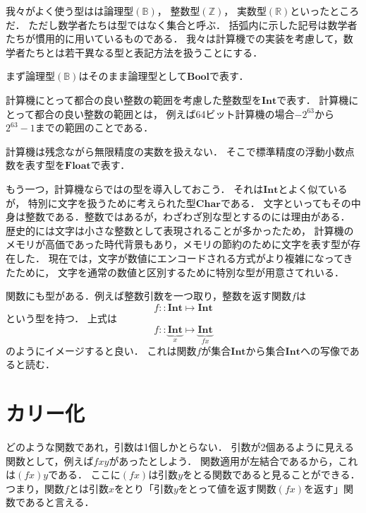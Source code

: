\documentclass[a5paper,draft]{jsbook}
\newcommand{\mathSpecialSet}[1]{\mathbb{#1}} %
\newcommand{\mathTypeName}[1]{\mathbf{#1}}
\newcommand{\mathIn}{\mathrel{::}}
\newcommand{\mathMapsTo}{\mapsto}
\newcommand{\mathMorph}[2]{#1\mathMapsTo#2}
\begin{document}
我々がよく使う型はは論理型$(\mathSpecialSet{B})$，
整数型$(\mathSpecialSet{Z})$，
実数型$(\mathSpecialSet{R})$といったところだ．
ただし数学者たちは型ではなく集合と呼ぶ．
括弧内に示した記号は数学者たちが慣用的に用いているものである．
我々は計算機での実装を考慮して，数学者たちとは若干異なる型と表記方法を扱うことにする．

まず論理型$(\mathSpecialSet{B})$はそのまま論理型として$\mathTypeName{Bool}$で表す．

計算機にとって都合の良い整数の範囲を考慮した整数型を$\mathTypeName{Int}$で表す．
計算機にとって都合の良い整数の範囲とは，
例えば64ビット計算機の場合$-2^{63}$から$2^{63}-1$までの範囲のことである．

計算機は残念ながら無限精度の実数を扱えない．
そこで標準精度の浮動小数点数を表す型を$\mathTypeName{Float}$で表す．

もう一つ，計算機ならではの型を導入しておこう．
それは$\mathTypeName{Int}$とよく似ているが，
特別に文字を扱うために考えられた型$\mathTypeName{Char}$である．
文字といってもその中身は整数である．整数ではあるが，わざわざ別な型とするのには理由がある．
歴史的には文字は小さな整数として表現されることが多かったため，
計算機のメモリが高価であった時代背景もあり，メモリの節約のために文字を表す型が存在した．
現在では，文字が数値にエンコードされる方式がより複雑になってきたために，
文字を通常の数値と区別するために特別な型が用意さてれいる．

関数にも型がある．例えば整数引数を一つ取り，整数を返す関数$f$は
\begin{equation}
f\mathIn\mathMorph{\mathTypeName{Int}}{\mathTypeName{Int}}
\end{equation}
という型を持つ．
上式は
\begin{equation}
f\mathIn
\underbrace{\mathTypeName{Int}}_x
\mathMapsTo
\underbrace{\mathTypeName{Int}}_{fx}
\end{equation}
のようにイメージすると良い．
これは関数$f$が集合$\mathTypeName{Int}$から集合$\mathTypeName{Int}$への写像であると読む．

\section{カリー化}

どのような関数であれ，引数は1個しかとらない．
引数が2個あるように見える関数として，例えば$fxy$があったとしよう．
関数適用が左結合であるから，これは$\left(fx\right)y$である．
ここに$\left(fx\right)$は引数$y$をとる関数であると見ることができる．
つまり，関数$f$とは引数$x$をとり「引数$y$をとって値を返す関数$\left(fx\right)$を返す」関数であると言える．
\end{document}
